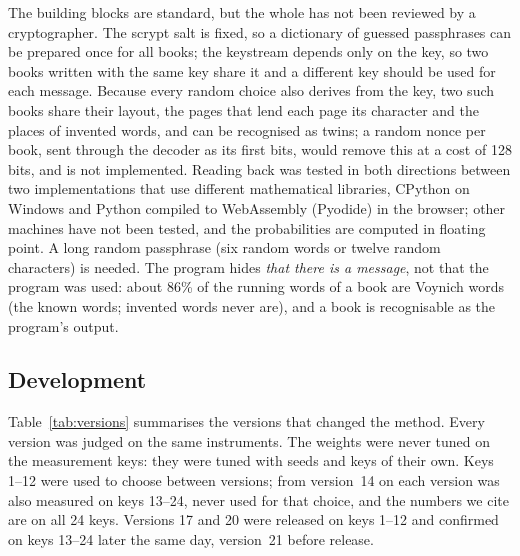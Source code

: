 The building blocks are standard, but the whole has not been reviewed by a cryptographer. The scrypt salt is fixed, so a
dictionary of guessed passphrases can be prepared once for all books; the keystream depends only on the key, so two books
written with the same key share it and a different key should be used for each message. Because every random choice
also derives from the key, two such books share their layout, the pages that lend each page its character and the places
of invented words, and can be recognised as twins; a random nonce per book, sent through the decoder as its first bits,
would remove this at a cost of 128 bits, and is not implemented. Reading back was tested in both directions between
two implementations that use different mathematical libraries, CPython on Windows and Python compiled to WebAssembly
(Pyodide) in the browser; other machines have not been tested, and the probabilities are computed in floating point. A long random passphrase (six
random words or twelve random characters) is needed. The program hides \emph{that there is a message}, not that the
program was used: about 86\% of the running words of a book are Voynich words (the known words; invented words never are), and a book is recognisable as the
program's output.

\subsection{Development}

Table~\ref{tab:versions} summarises the versions that changed the method. Every version was judged on the same
instruments. The weights were never tuned on the measurement keys: they were tuned with seeds and keys of their own.
Keys 1--12 were used to choose between versions; from version~14 on each version was also measured on keys 13--24,
never used for that choice, and the numbers we cite are on all 24 keys. Versions 17 and 20 were released on keys 1--12
and confirmed on keys 13--24 later the same day, version~21 before release.

